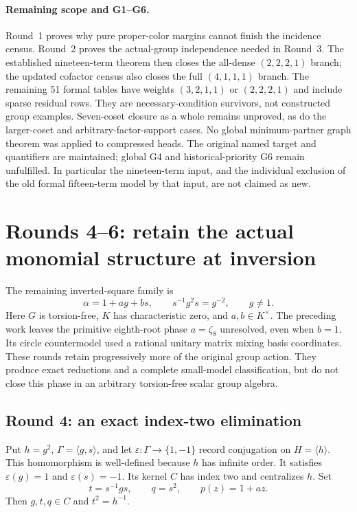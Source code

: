 \documentclass[11pt,a4paper,oneside]{report}
\theoremstyle{definition}
\theoremstyle{remark}
\begin{document}
\paragraph{Remaining scope and G1--G6.}
Round~1 proves why pure proper-color margins cannot finish the
incidence census. Round~2 proves the actual-group independence
needed in Round~3. The established nineteen-term theorem then
closes the all-dense $(2,2,2,1)$ branch; the updated cofactor census
also closes the full $(4,1,1,1)$ branch. The remaining 51 formal
tables have weights $(3,2,1,1)$ or $(2,2,2,1)$ and include sparse
residual rows. They are necessary-condition survivors, not
constructed group examples. Seven-coset closure as a whole remains
unproved, as do the larger-coset and arbitrary-factor-support cases.
No global minimum-partner graph theorem was applied to compressed
heads. The original named target and quantifiers are maintained;
global G4 and historical-priority G6 remain unfulfilled. In
particular the nineteen-term input, and the individual exclusion of
the old formal fifteen-term model by that input, are not claimed
as new.

\section{Rounds 4--6: retain the actual monomial structure at inversion}
\label{M13:nextinv:section}

The remaining inverted-square family is
\[
 \alpha=1+ag+bs,\qquad s^{-1}g^2s=g^{-2},\qquad g\ne1.
\]
Here $G$ is torsion-free, $K$ has characteristic zero, and
$a,b\in K^\times$.
The preceding work leaves the primitive eighth-root phase $a=\zeta_8$
unresolved, even when $b=1$. Its circle countermodel used a rational
unitary matrix mixing basis coordinates. These rounds retain progressively
more of the original group action. They produce exact reductions and a
complete small-model classification, but do not close this phase in an
arbitrary torsion-free scalar group algebra.

\subsection{Round 4: an exact index-two elimination}

Put $h=g^2$, $\Gamma=\langle g,s\rangle$, and let
$\varepsilon:\Gamma\to\{1,-1\}$ record conjugation on
$H=\langle h\rangle$. This homomorphism is well-defined because
$h$ has infinite order. It satisfies $\varepsilon(g)=1$ and
$\varepsilon(s)=-1$. Its kernel $C$ has index two and centralizes $h$.
Set
\[
 t=s^{-1}gs,\qquad q=s^2,\qquad p(z)=1+az.
\]
Then $g,t,q\in C$ and $t^2=h^{-1}$.
\end{document}
